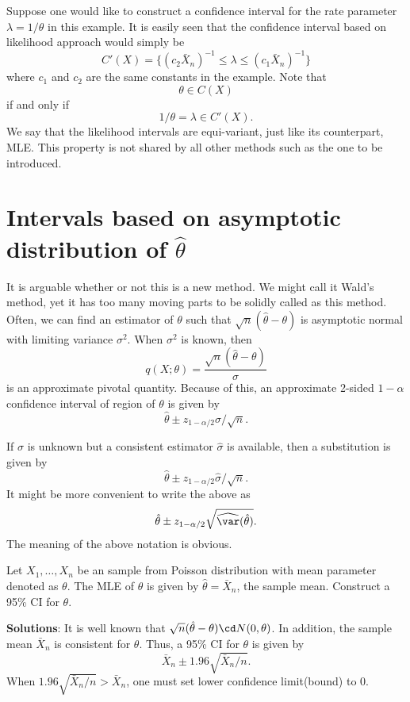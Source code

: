 Suppose one would like to construct a confidence interval for
the rate parameter $\lambda = 1/\theta$ in this example.
It is easily seen that the confidence interval based
on likelihood approach would simply be
\[
C'(X) = \{   (c_2 \bar X_n)^{-1} \leq \lambda \leq (c_1 \bar X_n)^{-1} \}
\]
where $c_1$ and $c_2$ are the same constants in the example.
Note that
\[
\theta \in C(X)
\]
if and only if
\[
1/\theta = \lambda \in C'(X).
\]
We say that the likelihood intervals are equi-variant, just like its
counterpart, MLE. This property is not shared by all other
methods such as the one to be introduced.

\section{Intervals based on asymptotic distribution of $\hat \theta$}

It is arguable whether or not this is a new method. We might call it
Wald's method, yet it has too many moving parts to be solidly called
as this method. 
Often, we can find an estimator of $\theta$ such that
$\sqrt{n}(\hat \theta - \theta)$ is asymptotic normal with limiting
variance $\sigma^2$. When $\sigma^2$ is known, then
\[
q(X; \theta) = \frac{\sqrt{n}(\hat \theta - \theta)}{\sigma}
\]
is an approximate pivotal quantity. 
Because of this, an approximate 2-sided $1-\alpha$ confidence interval of
region of $\theta$ is given by
\[
\hat \theta \pm z_{1-\alpha/2} \sigma /\sqrt{n}.
\]

If $\sigma$ is unknown but a consistent estimator $\hat \sigma$
is available, then a substitution is given by
\[
\hat \theta \pm z_{1-\alpha/2} \hat{ \sigma}/\sqrt{n}.
\]
It might be more convenient to write the above as
\[
\hat \theta \pm z_{1-\alpha/2} \sqrt{\widehat{\var}(\hat \theta)}.
\]
The meaning of the above notation is obvious.

\begin{example}
Let $X_1, \ldots, X_n$ be an \iid sample from Poisson distribution with
mean parameter denoted as $\theta$. The MLE of $\theta$ is given by
$\hat \theta = \bar X_n$, the sample mean.
Construct a 95\% CI for $\theta$.
\end{example}

\noindent
{\bf Solutions}:
It is well known that $\sqrt{n}( \hat \theta - \theta) \cd N(0, \theta)$.
In addition, the sample mean $\bar X_n$  is consistent for $\theta$.
Thus, a 95\% CI for $\theta$ is given by
\[
\bar X_n \pm 1.96 \sqrt{\bar X_n/n}.
\]
When $1.96 \sqrt{\bar X_n/n} > \bar X_n$, one must set
lower confidence limit(bound) to 0.

